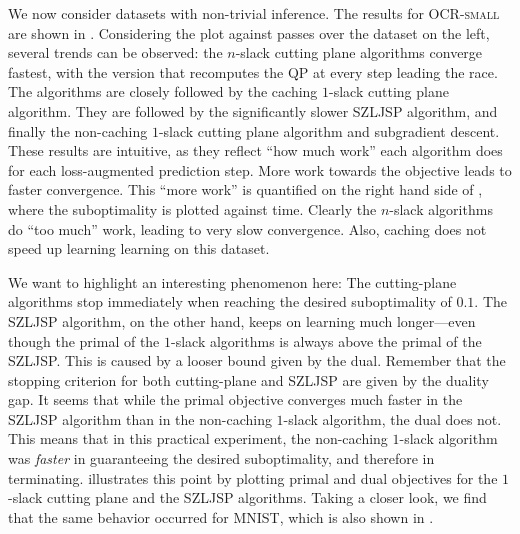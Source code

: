 We now consider datasets with non-trivial inference.
The results for \textsc{OCR-small} are shown in .
Considering the plot against passes over the dataset on the left, several
trends can be observed: the $n$-slack cutting plane algorithms converge
fastest, with the version that recomputes the QP at every step leading the
race. The algorithms are closely followed by the caching $1$-slack cutting
plane algorithm.  They are followed by the significantly slower SZLJSP
algorithm, and finally the non-caching $1$-slack cutting plane algorithm and
subgradient descent.  These results are intuitive, as they reflect ``how much
work'' each algorithm does for each loss-augmented prediction step. More work
towards the objective leads to faster convergence.  This ``more work'' is
quantified on the right hand side of , where the suboptimality is plotted against time.
Clearly the $n$-slack algorithms do ``too much'' work, leading to very slow
convergence.  Also, caching does not speed up learning learning on this
dataset.
 
We want to highlight an interesting phenomenon here: The cutting-plane
algorithms stop immediately when reaching the desired suboptimality of $0.1$.
The SZLJSP algorithm, on the other hand, keeps on learning much longer---even
though the primal of the $1$-slack algorithms is always above the primal of the
SZLJSP\@. This is caused by a looser bound given by the dual. Remember that the
stopping criterion for both cutting-plane and SZLJSP are given by the duality
gap. It seems that while the primal objective converges much faster in the
SZLJSP algorithm than in the non-caching $1$-slack algorithm, the dual does
not. This means that in this practical experiment, the non-caching $1$-slack
algorithm was \emph{faster} in guaranteeing the desired suboptimality, and
therefore in terminating.   illustrates this point by
plotting primal and dual objectives for the $1$-slack cutting plane and the
SZLJSP algorithms. Taking a closer look, we find that the same behavior
occurred for MNIST, which is also shown in .


